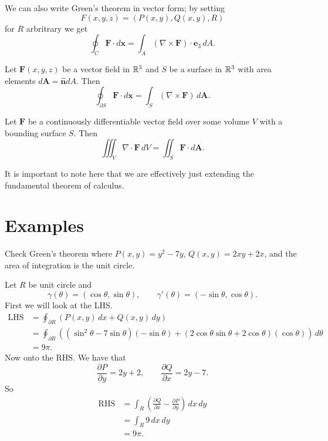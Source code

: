 \begin{remark}
    We can also write Green's theorem in vector form;
    by setting 
    \[
        F(x, y, z) = (P(x,y),Q(x,y),R)
    \]
    for $R$ arbritrary we get
    \[
        \oint_C \bm F \cdot d\bm x 
        = \int_A (\nabla \times \bm F) \cdot \bm e_3 \,dA.
    \]
\end{remark}

\begin{theorem}
    Let $\bm F(x,y,z)$ be a vector field in $\mathbb{R}^3$ and $S$ be a surface in $\mathbb{R}^3$
    with area elements $d\bm A = \hat{\bm n} dA$.
    Then
    \[
        \oint_{\partial S} \bm F \cdot d\bm x = \int_S (\nabla \times \bm F) \,d\bm A.
    \]
\end{theorem}

\begin{theorem}
    Let $\bm F$ be a continuously differentiable vector field over some volume $V$ 
    with a bounding surface $S$.
    Then
    \[
        \iiint_V \nabla \cdot \bm F \,dV = \iint_S \bm F \cdot d\bm A.
    \]
\end{theorem}

\begin{remark}
    It is important to note here that we are effectively just extending the
    fundamental theorem of calculus.
\end{remark}

\section{Examples}

\begin{example}
    Check Green's theorem where 
    $P(x,y) = y^2 - 7y$, 
    $Q(x,y) = 2xy + 2x$, and
    the area of integration is the unit circle.
\end{example}

\begin{solution}
    Let $R$ be unit circle and
    \[
        \gamma(\theta) = (\cos\theta, \sin\theta), \qquad
        \gamma'(\theta) = (-\sin\theta, \cos\theta).
    \]
    First we will look at the LHS.
    \begin{align*}
        \text{LHS} 
        &= \oint_{\partial R} (P(x,y)\,dx + Q(x,y)\,dy) \\
        &= \oint_{\partial R} 
            ((\sin^2\theta - 7\sin\theta) (-\sin\theta) +
            (2\cos\theta\sin\theta + 2\cos\theta) (\cos\theta))\,d\theta \\
        &= 9\pi.
    \end{align*}
    Now onto the RHS.
    We have that
    \[
        \frac{\partial P}{\partial y} = 2y + 2,
        \qquad \frac{\partial Q}{\partial x} = 2y - 7.
    \]
    So
    \begin{align*}
        \text{RHS}
        &= \int_R \left( \frac{\partial Q}{\partial x}
            - \frac{\partial P}{\partial y}\right) \,dx\,dy \\
        &= \int_R 9 \,dx\,dy \\
            &= 9\pi.
    \end{align*}
\end{solution}
